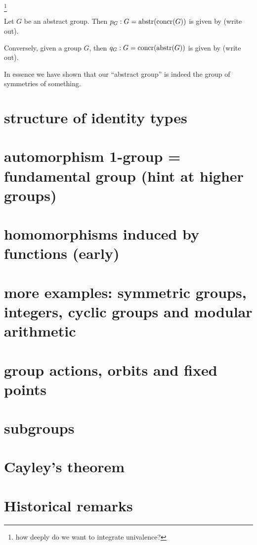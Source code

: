 \footnote{how deeply do we want to integrate univalence?}
\begin{lemma}
  \label{lem:Groupsareidentitytypes}Let $G$ be an abstract group.  Then $p_G:G=\mathrm{abstr}(\mathrm{concr}(G))$ is given by (write out).

Conversely, given a group $G$, then $q_G:G=\mathrm{concr}(\mathrm{abstr}(G))$  is given by (write out).
\end{lemma}
In essence we have shown that our ``abstract group'' is indeed the group of symmetries of something.

\section{structure of identity types}
\section{automorphism 1-group = fundamental group (hint at higher groups)}
\section{homomorphisms induced by functions (early)}
\section{more examples: symmetric groups, integers, cyclic groups and modular arithmetic}
\section{group actions, orbits and fixed points}
\section{subgroups}
\section{Cayley's theorem}
\section{Historical remarks}
\label{sec:grouphistory}



